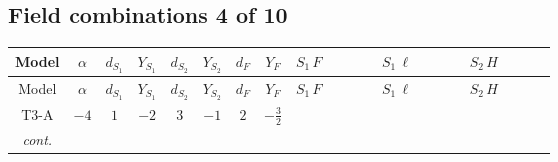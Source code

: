\documentclass[8pt]{article}
\begin{document}
\begin{landscape}
\subsection*{Field combinations 4 of 10}
\begin{longtable}{@{}cccccccc >{\raggedright\arraybackslash}p{0.21\linewidth} >{\raggedright\arraybackslash}p{0.21\linewidth} >{\raggedright\arraybackslash}p{0.21\linewidth}@{}}
\toprule
Model & $\alpha$ & $d_{S_1}$ & $Y_{S_1}$ & $d_{S_2}$ & $Y_{S_2}$ & $d_F$ & $Y_F$ & $S_1\,F$ & $S_1\,\ell$ & $S_2\,H$ \\
\midrule
\endfirsthead
\toprule
Model & $\alpha$ & $d_{S_1}$ & $Y_{S_1}$ & $d_{S_2}$ & $Y_{S_2}$ & $d_F$ & $Y_F$ & $S_1\,F$ & $S_1\,\ell$ & $S_2\,H$ \\
\midrule
\endhead
T3-A & $-4$ & $1$ & $-2$ & $3$ & $-1$ & $2$ & $-\frac{3}{2}$ & \scriptsize\adjustbox{max width=\linewidth}{$\begin{gathered} -2 \hbar  \log \left(\frac{\bar{\mu}^{2}}{M_F^2}\right) \overline{y_{1,i_1,r_1}} \overline{y_{1,i_2,r_2}} S_1^2 y_{1,i_1,r_2} y_{1,i_2,r_1} \left(S_1{}^{\dagger }\right){}^2 \\ +2 C_{S_1^\dagger S_1} \hbar  \log \left(\frac{\bar{\mu}^{2}}{M_F^2}\right) \overline{y_{1,i_1,r_1}} S_1 y_{1,i_1,r_1} S_1{}^{\dagger } \\ -2 \hbar  \log \left(\frac{\bar{\mu}^{2}}{M_F^2}\right) \overline{y_{1,i_1,r_1}} S_1^2 y_{1,i_1,r_1} \left(S_1{}^{\dagger }\right){}^2 \lambda_{S_1}^{(1)}\end{gathered}$} &  & \scriptsize\adjustbox{max width=\linewidth}{$\begin{gathered} -\frac{2 \hbar  \overline{y_{2,i_1,r_1}} \overline{Y_{e,i_2,i_3}} H_{a_1} S_{2,j_1} y_{2,i_2,r_1} Y_{e,i_1,i_3} H_{a_1}{}^{\dagger } S_{2,j_1}{}^{\dagger }}{\sqrt{3} \epsilon } \\ -\frac{2 \hbar  \overline{y_{2,i_1,r_1}} \overline{Y_{e,i_2,i_3}} H_{a_1} S_{2,j_1} y_{2,i_2,r_1} Y_{e,i_1,i_3} H_{a_1}{}^{\dagger } S_{2,j_1}{}^{\dagger }}{\sqrt{3}} \\ -\frac{2 i \sqrt{\frac{2}{3}} \hbar  \overline{y_{2,i_1,r_1}} \overline{Y_{e,i_2,i_3}} H_{a_2} S_{2,j_2} y_{2,i_2,r_1} Y_{e,i_1,i_3} H_{a_1}{}^{\dagger } S_{2,j_1}{}^{\dagger } \mathcal{I}_{H2,a_1,a_2,j_1,j_2}{}^1}{\epsilon }\end{gathered}$} \\
\textit{cont.} &  &  &  &  &  &  &  &  &  & \scriptsize\adjustbox{max width=\linewidth}{$\begin{gathered} -2 i \sqrt{\frac{2}{3}} \hbar  \overline{y_{2,i_1,r_1}} \overline{Y_{e,i_2,i_3}} H_{a_2} S_{2,j_2} y_{2,i_2,r_1} Y_{e,i_1,i_3} H_{a_1}{}^{\dagger } S_{2,j_1}{}^{\dagger } \mathcal{I}_{H2,a_1,a_2,j_1,j_2}{}^1 \\ +H_{a_2} S_{2,j_2} H_{a_1}{}^{\dagger } S_{2,j_1}{}^{\dagger } \mathcal{I}_{H2,a_1,a_2,j_1,j_2}{}^2 \lambda_{HS_2}^{(2)} \\ -\frac{2 \hbar  \overline{y_{2,i_1,r_1}} H_{a_2} S_{2,j_2} y_{2,i_1,r_1} H_{a_1}{}^{\dagger } S_{2,j_1}{}^{\dagger } \mathcal{I}_{H2,a_1,a_2,j_1,j_2}{}^2 \lambda_{HS_2}^{(2)}}{\sqrt{3} \epsilon }\end{gathered}$} \\

\end{longtable}
\end{landscape}
\end{document}
